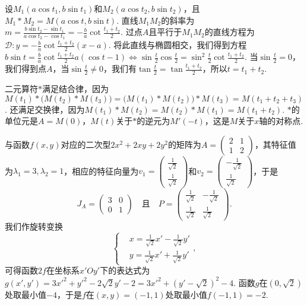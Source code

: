 \begin{solution}
  设$M_1(a\cos t_1,b\sin t_1)$和$M_2(a\cos t_2,b\sin t_2)$，且$M_1\ast M_2=M(a\cos t,b\sin t)$. 直线$M_1M_2$的斜率为$m=\frac{b\sin t_2-\sin t_1}{a\cos t_2-\cos t_1}=-\frac ba\cot\frac{t_1+t_2}2$. 过点$A$且平行于$M_1M_2$的直线方程为$\mathscr D:y=-\frac ba\cot\frac{t_1+t_2}2(x-a)$. 将此直线与椭圆相交，我们得到方程$b\sin t=\frac ba\cot\frac{t_1+t_2}2a(\cos t-1)\Leftrightarrow \sin\frac t2\cos\frac t2=\sin^2\frac t2\cot\frac{t_1+t_2}2$. 当$\sin\frac t2=0$，我们得到点$A$，当$\sin\frac t2\ne0$，我们有$\tan\frac t2=\tan\frac{t_1+t_2}2$，所以$t=t_1+t_2$.

  二元算符$\ast$满足结合律，因为$M(t_1)\ast\big(M(t_2)\ast M(t_3)\big)=\big(M(t_1)\ast M(t_2)\big)\ast M(t_3)=M(t_1+t_2+t_3)$. 还满足交换律，因为$M(t_1)\ast M(t_2)=M(t_2)\ast M(t_1)=M(t_1+t_2)$.  $\ast$的单位元是$A=M(0)$，$M(t)$关于$\ast$的逆元为$M'(-t)$，这是$M$关于$x$轴的对称点.
\end{solution}

\begin{solution}
  与函数$f(x,y)$对应的二次型$2x^2+2xy+2y^2$的矩阵为$A=\begin{pmatrix}
    2 & 1 \\
    1 & 2
  \end{pmatrix}$，其特征值为$\lambda_1=3,\lambda_2=1$，相应的特征向量为$v_1=\begin{pmatrix}
    \frac1{\sqrt2} \\
    \frac1{\sqrt2}
  \end{pmatrix}$和$v_2=\begin{pmatrix}
    -\frac1{\sqrt2} \\
    \frac1{\sqrt2}
  \end{pmatrix}$，于是
  \[
    J_A = \begin{pmatrix}
      3 & 0 \\
      0 & 1
    \end{pmatrix} \quad \text{且} \quad
    P = \begin{pmatrix}
      \frac1{\sqrt2} & - \frac1{\sqrt2} \\
      \frac1{\sqrt2} & \frac1{\sqrt2}
    \end{pmatrix}.
  \]
  我们作旋转变换
  \[
    \left\{
      \begin{aligned}
        & x = \frac1{\sqrt2}x' - \frac1{\sqrt2}y' \\
        & y = \frac1{\sqrt2}x' + \frac1{\sqrt2}y'
      \end{aligned}
    \right.,
  \]
  可得函数$2f$在坐标系$x'Oy'$下的表达式为$g(x',y')=3x'^2+y'^2-2\sqrt2y'-2
  =3x'^2+(y'-\sqrt2)^2-4 $. 函数$g$在$(0,\sqrt2)$处取最小值$-4$，于是$f$在$(x,y)=(-1,1)$处取最小值$f(-1,1)=-2$.
\end{solution}


